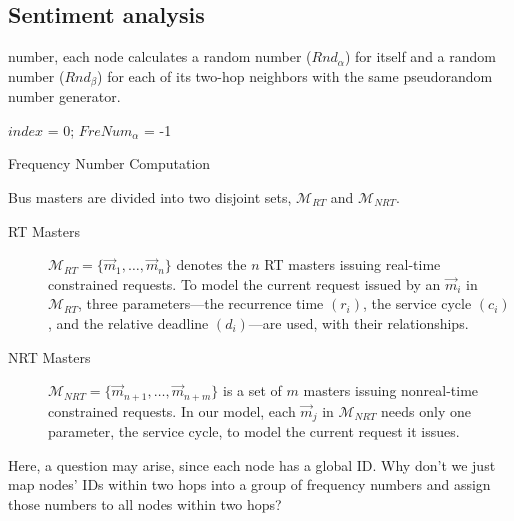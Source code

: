 \documentclass[acmtog, authorversion]{acmart}
\begin{document}
\subsection{Sentiment analysis}

number, each node calculates a random number (${\textit{Rnd}}_{\alpha}$) for
itself and a random number (${\textit{Rnd}}_{\beta}$) for each of its two-hop
neighbors with the same pseudorandom number generator.

\begin{algorithm}[t]
\SetAlgoNoLine
{}
$index$ = 0; $FreNum_{\alpha}$ = -1\;
\caption{Frequency Number Computation}
\label{alg:one}
\end{algorithm}


Bus masters are divided into two disjoint sets, $\mathcal{M}_{RT}$
and $\mathcal{M}_{NRT}$.
\begin{description}
\item[RT Masters]
$\mathcal{M}_{RT}=\{ \vec{m}_{1},\dots,\vec{m}_{n}\}$ denotes the
$n$ RT masters issuing real-time constrained requests. To model the
current request issued by an $\vec{m}_{i}$ in $\mathcal{M}_{RT}$,
three parameters---the recurrence time $(r_i)$, the service cycle
$(c_i)$, and the relative deadline $(d_i)$---are used, with their
relationships.
\item[NRT Masters]
$\mathcal{M}_{NRT}=\{ \vec{m}_{n+1},\dots,\vec{m}_{n+m}\}$ is a set
of $m$ masters issuing nonreal-time constrained requests. In our
model, each $\vec{m}_{j}$ in $\mathcal{M}_{NRT}$ needs only one
parameter, the service cycle, to model the current request it
issues.
\end{description}

Here, a question may arise, since each node has a global ID. Why
don't we just map nodes' IDs within two hops into a group of
frequency numbers and assign those numbers to all nodes within two
hops?
\end{document}
